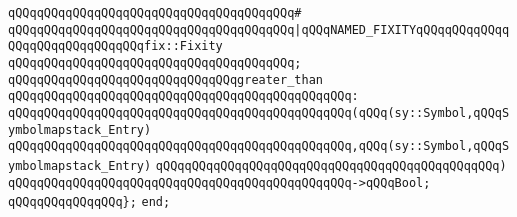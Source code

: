 \verb|qQQqqQQqqQQqqQQqqQQqqQQqqQQqqQQqqQQqqQQq#|\newline
\verb|qQQqqQQqqQQqqQQqqQQqqQQqqQQqqQQqqQQqqQQq|\verb#|qQQqNAMED_FIXITYqQQqqQQqqQQqqQQqqQQqqQQqqQQqqQQqfix::Fixity#\newline
\verb|qQQqqQQqqQQqqQQqqQQqqQQqqQQqqQQqqQQqqQQq;|\newline
\newline
\verb|qQQqqQQqqQQqqQQqqQQqqQQqqQQqqQQqgreater_than|\newline
\verb|qQQqqQQqqQQqqQQqqQQqqQQqqQQqqQQqqQQqqQQqqQQqqQQq:|\newline
\verb|qQQqqQQqqQQqqQQqqQQqqQQqqQQqqQQqqQQqqQQqqQQqqQQq(qQQq(sy::Symbol,qQQqSymbolmapstack_Entry)|\newline
\verb|qQQqqQQqqQQqqQQqqQQqqQQqqQQqqQQqqQQqqQQqqQQqqQQq,qQQq(sy::Symbol,qQQqSymbolmapstack_Entry)|\newline
\verb|qQQqqQQqqQQqqQQqqQQqqQQqqQQqqQQqqQQqqQQqqQQqqQQq)|\newline
\verb|qQQqqQQqqQQqqQQqqQQqqQQqqQQqqQQqqQQqqQQqqQQqqQQq->qQQqBool;|\newline
\newline
\verb|qQQqqQQqqQQqqQQq};|\newline
\newline
\verb|end;|\newline

